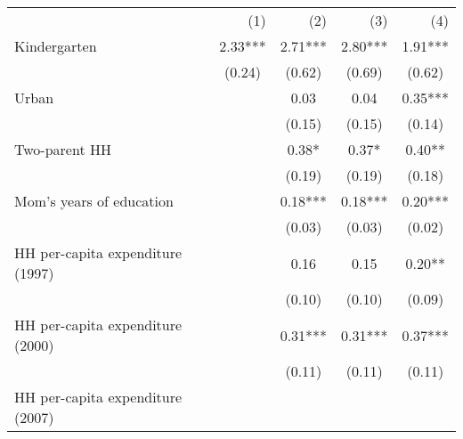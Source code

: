\begin{tabular}{lllll}
\cline{1-5}
\multicolumn{1}{c}{} &
  \multicolumn{1}{r}{(1)} &
  \multicolumn{1}{r}{(2)} &
  \multicolumn{1}{r}{(3)} &
  \multicolumn{1}{r}{(4)} \\
\cline{1-5}
\multicolumn{1}{l}{Kindergarten} &
  \multicolumn{1}{c}{2.33***} &
  \multicolumn{1}{c}{2.71***} &
  \multicolumn{1}{c}{2.80***} &
  \multicolumn{1}{c}{1.91***} \\
\multicolumn{1}{l}{} &
  \multicolumn{1}{c}{(0.24)} &
  \multicolumn{1}{c}{(0.62)} &
  \multicolumn{1}{c}{(0.69)} &
  \multicolumn{1}{c}{(0.62)} \\
\multicolumn{1}{l}{Urban} &
  \multicolumn{1}{c}{} &
  \multicolumn{1}{c}{0.03 } &
  \multicolumn{1}{c}{0.04 } &
  \multicolumn{1}{c}{0.35***} \\
\multicolumn{1}{l}{} &
  \multicolumn{1}{c}{} &
  \multicolumn{1}{c}{(0.15)} &
  \multicolumn{1}{c}{(0.15)} &
  \multicolumn{1}{c}{(0.14)} \\
\multicolumn{1}{l}{Two-parent HH} &
  \multicolumn{1}{c}{} &
  \multicolumn{1}{c}{0.38* } &
  \multicolumn{1}{c}{0.37* } &
  \multicolumn{1}{c}{0.40** } \\
\multicolumn{1}{l}{} &
  \multicolumn{1}{c}{} &
  \multicolumn{1}{c}{(0.19)} &
  \multicolumn{1}{c}{(0.19)} &
  \multicolumn{1}{c}{(0.18)} \\
\multicolumn{1}{l}{Mom's years of education} &
  \multicolumn{1}{c}{} &
  \multicolumn{1}{c}{0.18***} &
  \multicolumn{1}{c}{0.18***} &
  \multicolumn{1}{c}{0.20***} \\
\multicolumn{1}{l}{} &
  \multicolumn{1}{c}{} &
  \multicolumn{1}{c}{(0.03)} &
  \multicolumn{1}{c}{(0.03)} &
  \multicolumn{1}{c}{(0.02)} \\
\multicolumn{1}{l}{HH per-capita expenditure (1997)} &
  \multicolumn{1}{c}{} &
  \multicolumn{1}{c}{0.16 } &
  \multicolumn{1}{c}{0.15 } &
  \multicolumn{1}{c}{0.20** } \\
\multicolumn{1}{l}{} &
  \multicolumn{1}{c}{} &
  \multicolumn{1}{c}{(0.10)} &
  \multicolumn{1}{c}{(0.10)} &
  \multicolumn{1}{c}{(0.09)} \\
\multicolumn{1}{l}{HH per-capita expenditure (2000)} &
  \multicolumn{1}{c}{} &
  \multicolumn{1}{c}{0.31***} &
  \multicolumn{1}{c}{0.31***} &
  \multicolumn{1}{c}{0.37***} \\
\multicolumn{1}{l}{} &
  \multicolumn{1}{c}{} &
  \multicolumn{1}{c}{(0.11)} &
  \multicolumn{1}{c}{(0.11)} &
  \multicolumn{1}{c}{(0.11)} \\
\multicolumn{1}{l}{HH per-capita expenditure (2007)} &

\end{tabular}
